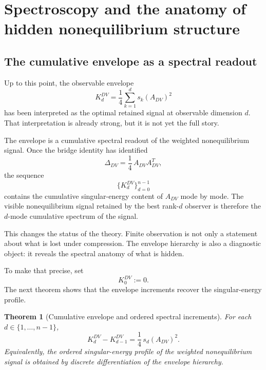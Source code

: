 \documentclass[11pt,a4paper]{article}
\numberwithin{equation}{section}
\theoremstyle{thmcompact}
\newtheorem{theorem}{Theorem}[section]
\theoremstyle{remark}
\begin{document}
\section{Spectroscopy and the anatomy of hidden nonequilibrium structure}
\label{sec:spectroscopy-hidden-structure}

\subsection{The cumulative envelope as a spectral readout}

Up to this point, the observable envelope
\begin{equation}
K_d^{DV}
=
\frac14\sum_{k=1}^{d}s_k(A_{DV})^2
\end{equation}
has been interpreted as the optimal retained signal at observable dimension \(d\). That interpretation is already strong, but it is not yet the full story.

The envelope is a cumulative spectral readout of the weighted nonequilibrium signal. Once the bridge identity has identified
\begin{equation}
\Delta_{DV}
=
\frac14\,A_{DV}A_{DV}^{T},
\end{equation}
the sequence
\begin{equation}
\{K_d^{DV}\}_{d=0}^{n-1}
\end{equation}
contains the cumulative singular-energy content of \(A_{DV}\) mode by mode. The visible nonequilibrium signal retained by the best rank-\(d\) observer is therefore the \(d\)-mode cumulative spectrum of the signal.

This changes the status of the theory. Finite observation is not only a statement about what is lost under compression. The envelope hierarchy is also a diagnostic object: it reveals the spectral anatomy of what is hidden.

To make that precise, set
\begin{equation}
K_0^{DV}:=0.
\end{equation}
The next theorem shows that the envelope increments recover the singular-energy profile.

\begin{theorem}[Cumulative envelope and ordered spectral increments]
\label{thm:cumulative_envelope_exact_spectral_increments}
For each \(d\in\{1,\dots,n-1\}\),
\begin{equation}
K_d^{DV}-K_{d-1}^{DV}
=
\frac14\,s_d(A_{DV})^2.
\end{equation}
Equivalently, the ordered singular-energy profile of the weighted nonequilibrium signal is obtained by discrete differentiation of the envelope hierarchy.
\end{theorem}
\end{document}
